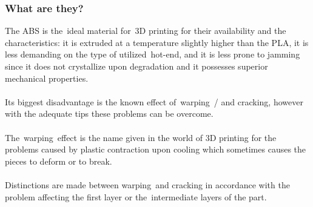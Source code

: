 \documentclass[11pt,a4paper]{article}
\begin{document}
		\subsubsection{What are they?}The ABS is the ideal material for 3D printing for their availability and the characteristics: it is extruded at a temperature slightly higher than the PLA, it is less demanding on the type of utilized hot-end, and it is less prone to jamming since it does not crystallize upon degradation and it possesses superior mechanical properties.
\\\\
Its biggest disadvantage is the known effect of warping / and cracking, however with the adequate tips these problems can be overcome.
\\\\
The warping effect is the name given in the world of 3D printing for the problems caused by plastic contraction upon cooling which sometimes causes the pieces to deform or to break.
\\\\
Distinctions are made between warping and cracking in accordance with the problem affecting the first layer or the intermediate layers of the part.
\end{document}
